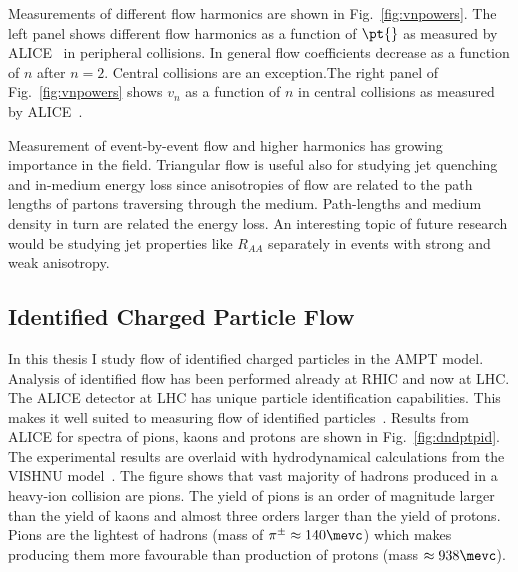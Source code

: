 Measurements of different flow harmonics are shown in Fig.~\ref{fig:vnpowers}. The left panel shows different flow harmonics as a function of $\pt{}$ as measured by ALICE~\cite{PRL107032301} in peripheral collisions. In general flow coefficients decrease as a function of $n$ after $n=2$. Central collisions are an exception.The right panel of  Fig.~\ref{fig:vnpowers} shows $v_n$ as a function of $n$ in central collisions as measured by ALICE~\cite{Aamodt2012249}.



Measurement of event-by-event flow and higher harmonics has growing importance in the field. Triangular flow is useful also for studying jet quenching and in-medium energy loss since anisotropies of flow are related to the path lengths of partons traversing through the medium. Path-lengths and medium density in turn are related the energy loss. An interesting topic of future research would be studying jet properties like $R_{AA}$ separately in events with strong and weak anisotropy.


\FloatBarrier
\pagebreak
\subsection{Identified Charged Particle Flow}
\label{sec:qns}
In this thesis I study flow of identified charged particles in the AMPT model. Analysis of identified flow has been performed already at RHIC and now at LHC. The ALICE detector at LHC has unique particle identification capabilities. This makes it well suited to measuring flow of identified particles~\cite{Abelev:2013vea}. Results from ALICE for spectra of pions, kaons and protons are shown in Fig.~\ref{fig:dndptpid}. The experimental results are overlaid with hydrodynamical calculations from the VISHNU model~\cite{Song:2013qma}. The figure shows that vast majority of hadrons produced in a heavy-ion collision are pions.  The yield of pions is an order of magnitude larger than the yield of kaons and almost three orders larger than the yield of protons. Pions are the lightest of hadrons (mass of $\pi^\pm\approx140\mevc$) which makes producing them more favourable than production of protons (mass $\approx 938 \mevc$). 

